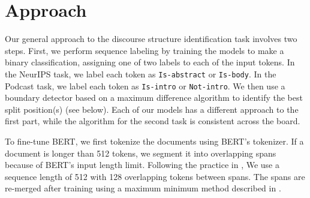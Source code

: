 
\section{Approach} \label{sec:approach}
Our general approach to the discourse structure identification task involves two steps. First, we perform sequence labeling by training the models to make a binary classification, assigning one of two labels to each of the input tokens. In the NeurIPS task, we label each token as \texttt{Is-abstract} or \texttt{Is-body}. In the Podcast task, we label each token as \texttt{Is-intro} or \texttt{Not-intro}. We then use a boundary detector based on a maximum difference algorithm to identify the best split position(s) (see below). Each of our models has a different approach to the first part, while the algorithm for the second task is consistent across the board.

To fine-tune BERT, we first tokenize the documents using BERT's tokenizer. If a document is longer than 512 tokens, we segment it into overlapping spans because of BERT's input length limit. Following the practice in \citet{devlin2018bert}, We use a sequence length of 512 with 128 overlapping tokens between spans. The spans are re-merged after training using a maximum minimum method described in \citet{devlin2018bert}. 

